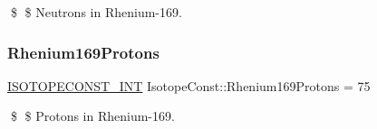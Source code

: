 \$ \$ Neutrons in Rhenium-\/169. \mbox{\label{group___isotope_const-_rhenium-_re169_ga676bb3c1e8b2cb2c271c081c54604a6d}} 
\subsubsection{\texorpdfstring{Rhenium169\+Protons}{Rhenium169Protons}}
{\footnotesize\ttfamily \mbox{\hyperlink{group___isotope_const-_macros_ga5f18360b3e99483a35c32d789e62621c}{I\+S\+O\+T\+O\+P\+E\+C\+O\+N\+S\+T\+\_\+\+I\+NT}} Isotope\+Const\+::\+Rhenium169\+Protons = 75}

\$ \$ Protons in Rhenium-\/169. 
